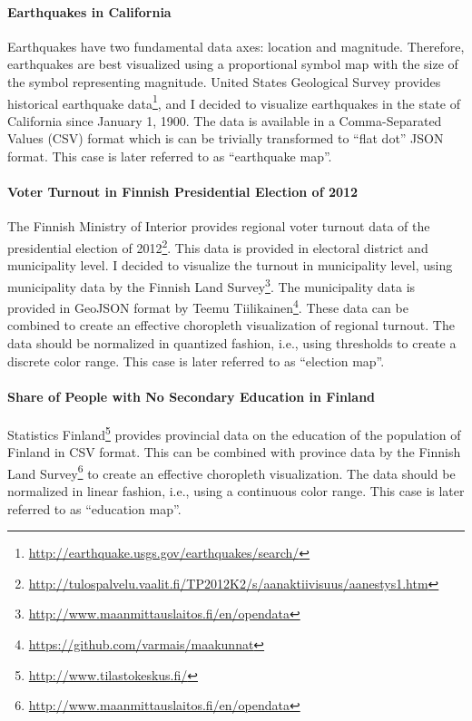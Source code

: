 \paragraph{Earthquakes in California}
Earthquakes have two fundamental data axes: location and magnitude. Therefore, earthquakes are best visualized using a proportional symbol map with the size of the symbol representing magnitude. United States Geological Survey provides historical earthquake data\footnote{\url{http://earthquake.usgs.gov/earthquakes/search/}}, and I decided to visualize earthquakes in the state of California since January 1, 1900. The data is available in a Comma-Separated Values (CSV) format which is can be trivially transformed to ``flat dot'' JSON format. This case is later referred to as ``earthquake map''.

\paragraph{Voter Turnout in Finnish Presidential Election of 2012}
The Finnish Ministry of Interior provides regional voter turnout data of the presidential election of 2012\footnote{\url{http://tulospalvelu.vaalit.fi/TP2012K2/s/aanaktiivisuus/aanestys1.htm}}. This data is provided in electoral district and municipality level. I decided to visualize the turnout in municipality level, using municipality data by the Finnish Land Survey\footnote{\url{http://www.maanmittauslaitos.fi/en/opendata}}. The municipality data is provided in GeoJSON format by Teemu Tiilikainen\footnote{\url{https://github.com/varmais/maakunnat}}. These data can be combined to create an effective choropleth visualization of regional turnout. The data should be normalized in quantized fashion, i.e., using thresholds to create a discrete color range. This case is later referred to as ``election map''.

\paragraph{Share of People with No Secondary Education in Finland}
Statistics Finland\footnote{\url{http://www.tilastokeskus.fi/}} provides provincial data on the education of the population of Finland in CSV format. This can be combined with province data by the Finnish Land Survey\footnote{\url{http://www.maanmittauslaitos.fi/en/opendata}} to create an effective choropleth visualization. The data should be normalized in linear fashion, i.e., using a continuous color range. This case is later referred to as ``education map''.

